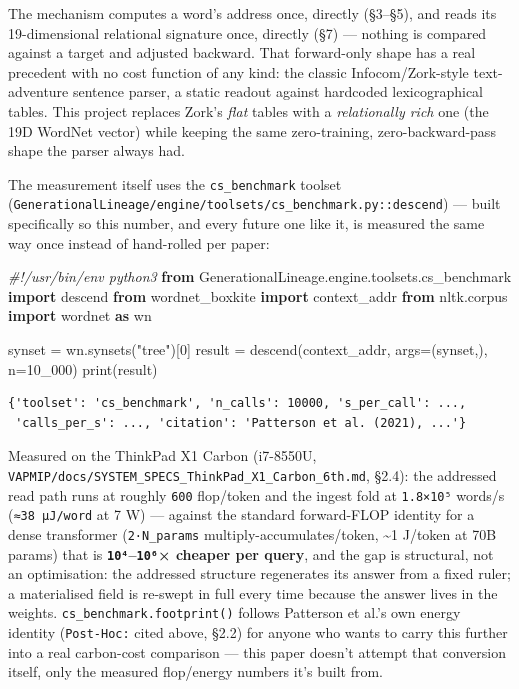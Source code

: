 \documentclass[
  10pt,
]{article}
\newenvironment{Shaded}{}{}
\newcommand{\BuiltInTok}[1]{\textcolor[rgb]{0.00,0.50,0.00}{#1}}
\newcommand{\CommentTok}[1]{\textcolor[rgb]{0.38,0.63,0.69}{\textit{#1}}}
\newcommand{\DecValTok}[1]{\textcolor[rgb]{0.25,0.63,0.44}{#1}}
\newcommand{\ImportTok}[1]{\textcolor[rgb]{0.00,0.50,0.00}{\textbf{#1}}}
\newcommand{\NormalTok}[1]{#1}
\newcommand{\OperatorTok}[1]{\textcolor[rgb]{0.40,0.40,0.40}{#1}}
\newcommand{\StringTok}[1]{\textcolor[rgb]{0.25,0.44,0.63}{#1}}
\begin{document}
The mechanism computes a word's address once, directly (§3--§5), and
reads its 19-dimensional relational signature once, directly (§7) ---
nothing is compared against a target and adjusted backward. That
forward-only shape has a real precedent with no cost function of any
kind: the classic Infocom/Zork-style text-adventure sentence parser, a
static readout against hardcoded lexicographical tables. This project
replaces Zork's \emph{flat} tables with a \emph{relationally rich} one
(the 19D WordNet vector) while keeping the same zero-training,
zero-backward-pass shape the parser always had.

The measurement itself uses the \texttt{cs\_benchmark} toolset
(\texttt{GenerationalLineage/engine/toolsets/cs\_benchmark.py::descend})
--- built specifically so this number, and every future one like it, is
measured the same way once instead of hand-rolled per paper:

\begin{Shaded}
\begin{Highlighting}[]
\CommentTok{\#!/usr/bin/env python3}
\ImportTok{from}\NormalTok{ GenerationalLineage.engine.toolsets.cs\_benchmark }\ImportTok{import}\NormalTok{ descend}
\ImportTok{from}\NormalTok{ wordnet\_boxkite }\ImportTok{import}\NormalTok{ context\_addr}
\ImportTok{from}\NormalTok{ nltk.corpus }\ImportTok{import}\NormalTok{ wordnet }\ImportTok{as}\NormalTok{ wn}

\NormalTok{synset }\OperatorTok{=}\NormalTok{ wn.synsets(}\StringTok{"tree"}\NormalTok{)[}\DecValTok{0}\NormalTok{]}
\NormalTok{result }\OperatorTok{=}\NormalTok{ descend(context\_addr, args}\OperatorTok{=}\NormalTok{(synset,), n}\OperatorTok{=}\DecValTok{10\_000}\NormalTok{)}
\BuiltInTok{print}\NormalTok{(result)}
\end{Highlighting}
\end{Shaded}

\begin{verbatim}
{'toolset': 'cs_benchmark', 'n_calls': 10000, 's_per_call': ...,
 'calls_per_s': ..., 'citation': 'Patterson et al. (2021), ...'}
\end{verbatim}

Measured on the ThinkPad X1 Carbon (i7-8550U,
\texttt{VAPMIP/docs/SYSTEM\_SPECS\_ThinkPad\_X1\_Carbon\_6th.md}, §2.4):
the addressed read path runs at roughly \texttt{600} flop/token and the
ingest fold at \texttt{1.8×10⁵} words/s (\texttt{≈38\ µJ/word} at 7 W)
--- against the standard forward-FLOP identity for a dense transformer
(\texttt{2·N\_params} multiply-accumulates/token, \textasciitilde1
J/token at 70B params) that is \textbf{\texttt{10⁴}--\texttt{10⁶}×
cheaper per query}, and the gap is structural, not an optimisation: the
addressed structure regenerates its answer from a fixed ruler; a
materialised field is re-swept in full every time because the answer
lives in the weights. \texttt{cs\_benchmark.footprint()} follows
Patterson et al.'s own energy identity (\texttt{Post-Hoc:} cited above,
§2.2) for anyone who wants to carry this further into a real carbon-cost
comparison --- this paper doesn't attempt that conversion itself, only
the measured flop/energy numbers it's built from.
\end{document}
